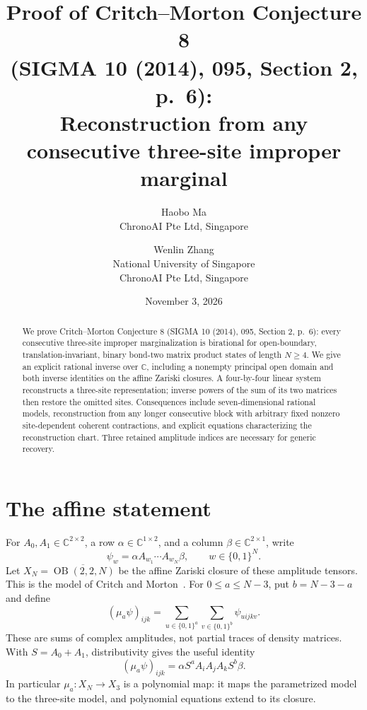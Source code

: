 \documentclass[11pt]{article}
\title{Proof of Critch--Morton Conjecture 8\protect\\
\large (SIGMA 10 (2014), 095, Section 2, p.\ 6):\protect\\
Reconstruction from any consecutive three-site improper marginal}
\author{Haobo Ma\\\small ChronoAI Pte Ltd, Singapore
\and Wenlin Zhang\\\small National University of Singapore\\\small ChronoAI Pte Ltd, Singapore}
\date{November 3, 2026}
\newcommand{\C}{\mathbb C}
\newcommand{\OB}{\operatorname{OB}}
\begin{document}
\maketitle
\begin{abstract}
We prove Critch--Morton Conjecture 8 (SIGMA 10 (2014), 095, Section 2, p.\ 6):
every consecutive three-site improper marginalization is birational
for open-boundary, translation-invariant, binary bond-two matrix product states
of length $N\geq4$.
We give an explicit rational inverse over $\C$, including a nonempty principal
open domain and both inverse identities on the affine Zariski closures.
A four-by-four linear system reconstructs a three-site representation; inverse
powers of the sum of its two matrices then restore the omitted sites.
Consequences include seven-dimensional rational models, reconstruction from
any longer consecutive block with arbitrary fixed nonzero site-dependent
coherent contractions, and explicit equations characterizing the reconstruction
chart. Three retained amplitude indices are necessary for generic recovery.
\end{abstract}

\section{The affine statement}
For $A_0,A_1\in\C^{2\times2}$, a row $\alpha\in\C^{1\times2}$,
and a column $\beta\in\C^{2\times1}$, write
\begin{equation}\label{eq:state}
 \psi_w=\alpha A_{w_1}\cdots A_{w_N}\beta,
 \qquad w\in\{0,1\}^N.
\end{equation}
Let $X_N=\overline{\OB(2,2,N)}$ be the affine Zariski closure of these
amplitude tensors. This is the model of Critch and Morton~\cite[Section 2,
equation (2)]{CM}. For $0\leq a\leq N-3$, put $b=N-3-a$ and define
\begin{equation}\label{eq:marginal}
 (\mu_a\psi)_{ijk}=\sum_{u\in\{0,1\}^a}\sum_{v\in\{0,1\}^b}\psi_{uijkv}.
\end{equation}
These are sums of complex amplitudes, not partial traces of density matrices.
With $S=A_0+A_1$, distributivity gives the useful identity
\begin{equation}\label{eq:outside}
 (\mu_a\psi)_{ijk}=\alpha S^a A_iA_jA_k S^b\beta.
\end{equation}
In particular $\mu_a:X_N\to X_3$ is a polynomial map: it maps the parametrized
model to the three-site model, and polynomial equations extend to its closure.
\end{document}
